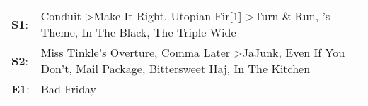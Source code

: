 \begin{supertabular}{p{0.03\textwidth}p{0.92\textwidth}}
 \textbf{S1}:  &     Conduit\textsuperscript{} \textgreater \enspace Make It Right\textsuperscript{}, \enspace Utopian Fir[1]\textsuperscript{} \textgreater \enspace Turn \& Run\textsuperscript{}, 's Theme\textsuperscript{}, \enspace In The Black\textsuperscript{}, \enspace The Triple Wide\textsuperscript{}  \enspace  \\
 \textbf{S2}:  &  Miss Tinkle's Overture\textsuperscript{}, \enspace Comma Later\textsuperscript{} \textgreater \enspace JaJunk\textsuperscript{}, \enspace Even If You Don't\textsuperscript{}, \enspace Mail Package\textsuperscript{}, \enspace Bittersweet Haj\textsuperscript{}, \enspace In The Kitchen\textsuperscript{}  \enspace  \\
 \textbf{E1}:  &                                                                                                                                                                                                                                                                                   Bad Friday\textsuperscript{}  \enspace  \\
\end{supertabular}
